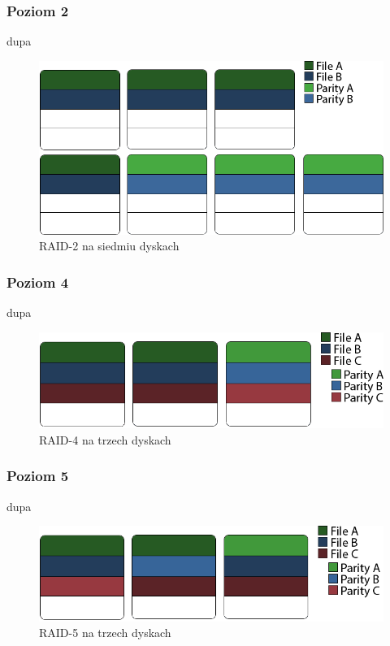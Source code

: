 \subsubsection{Poziom 2}
dupa
\begin{figure}[h!]
        \centering
        \includegraphics{raid-2.png}
        \caption{RAID-2 na siedmiu dyskach}
        \label{fig:raid2}
\end{figure}
\subsubsection{Poziom 4}
dupa
\begin{figure}[h!]
        \centering
        \includegraphics{raid-4.png}
        \caption{RAID-4 na trzech dyskach}
        \label{fig:raid4}
\end{figure}
\subsubsection{Poziom 5}
dupa
\begin{figure}[h!]
        \centering
        \includegraphics{raid-5.png}
        \caption{RAID-5 na trzech dyskach}
        \label{fig:raid5}
\end{figure}
